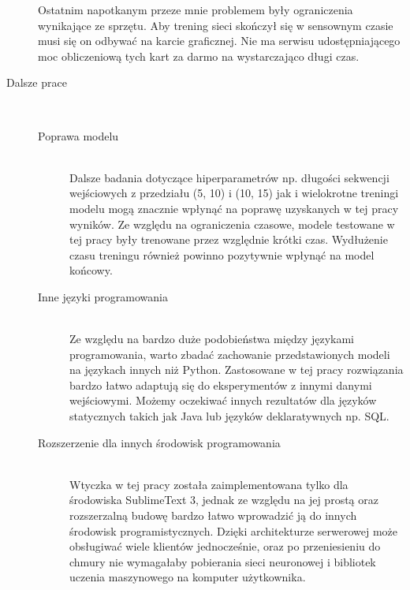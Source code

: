 \begin{description}
    Ostatnim napotkanym przeze mnie problemem były ograniczenia wynikające ze sprzętu. Aby trening sieci skończył się w 
    sensownym czasie musi się on odbywać na karcie graficznej. Nie ma serwisu udostępniającego moc obliczeniową tych 
    kart za darmo na wystarczająco długi czas.  \\
    \item[Dalsze prace] 
    \hfill \\ 
\begin{description}
    \item[Poprawa modelu] 
    \hfill \\ Dalsze badania dotyczące hiperparametrów np. długości sekwencji wejściowych z przedziału (5, 10) i (10, 15) jak i 
    wielokrotne treningi modelu mogą znacznie wpłynąć na poprawę uzyskanych w tej pracy wyników. Ze względu na ograniczenia czasowe, 
    modele testowane w tej pracy były trenowane przez względnie krótki czas. Wydłużenie czasu treningu również powinno pozytywnie 
    wpłynąć na model końcowy. 
     \\
    \item[Inne języki programowania] 
    \hfill \\ Ze względu na bardzo duże podobieństwa między językami programowania, warto zbadać zachowanie przedstawionych modeli 
    na językach innych niż Python. Zastosowane w tej pracy rozwiązania bardzo łatwo adaptują się do eksperymentów z innymi danymi
    wejściowymi. Możemy oczekiwać innych rezultatów dla języków statycznych takich jak Java lub języków deklaratywnych np. SQL. \\
    \item[Rozszerzenie dla innych środowisk programowania]
    \hfill \\ Wtyczka w tej pracy została zaimplementowana tylko dla środowiska SublimeText 3, jednak ze względu na jej prostą oraz 
    rozszerzalną budowę bardzo łatwo wprowadzić ją do innych środowisk programistycznych. Dzięki architekturze serwerowej może obsługiwać 
    wiele klientów jednocześnie, oraz po przeniesieniu do chmury nie wymagałaby pobierania sieci neuronowej i bibliotek uczenia maszynowego 
    na komputer użytkownika.\\
  \end{description}

  \end{description}